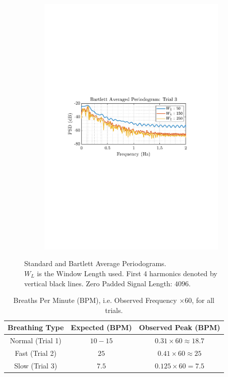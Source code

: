 \documentclass[12pt]{article}
\begin{document}
\begin{figure}[H]
\begin{subfigure}{0.49\textwidth}
			\includegraphics[trim={2.2cm 11.2cm 3.15cm  11.2cm}, clip, width=\textwidth]{../MATLAB/figures/q1_5a_fig06.pdf} 
		\end{subfigure}
		\captionsetup{justification=centering}
		\caption{Standard and Bartlett Average Periodograms. \\ $W_L$ is the Window Length used. First 4 harmonics denoted by vertical black lines. Zero Padded Signal Length: $4096$.}
		\label{fig: 1-5a}
	\end{figure}

	\begin{table}[H]
		\centering
		\begin{tabular}{|c|c||c|}
			\hline
			\textbf{Breathing Type} & \textbf{Expected} (BPM) & \textbf{Observed Peak} (BPM) \\
			\hline
			\hline
			{Normal (Trial 1)} & $10-15$ & $0.31\times60\approx18.7$ \\
			\hline
			{Fast (Trial 2)} & $25$ & $0.41\times60\approx25$ \\
			\hline
			{Slow (Trial 3)} & $7.5$ & $0.125\times60=7.5$ \\
			\hline
		\end{tabular}
		\captionsetup{justification=centering}
		\caption{Breaths Per Minute (BPM), i.e. Observed Frequency $\times 60$, for all trials.}
		\label{tab: 1-5a}
	\end{table}
\end{document}
